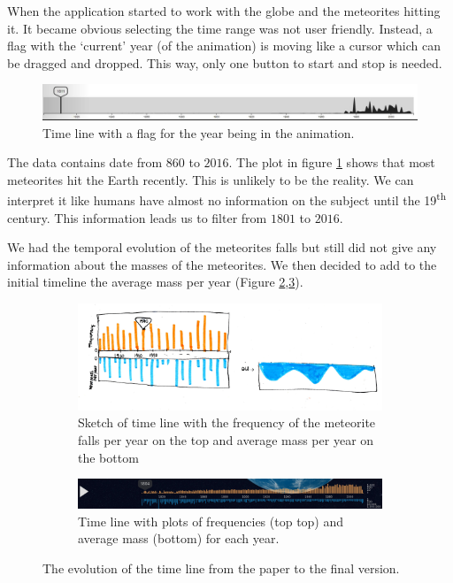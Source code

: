 \documentclass[10pt,conference,compsocconf]{IEEEtran}
\begin{document}
When the application started to work with the globe and the meteorites hitting it. It became obvious selecting the time range was not user friendly. Instead, a flag with the `current' year (of the animation) is moving like a cursor which can be dragged and dropped. This way, only one button to start and stop is needed.

\begin{figure}[H]
  \centering
  \includegraphics[width=\columnwidth]{images/timeline_original.jpg}
  \vspace{-3mm}
  \caption{Time line with a flag for the year being in the animation.}
  \label{fig:timeline_all_dates}
\end{figure}

The data contains date from $860$ to $2016$. The plot in figure \ref{fig:timeline_all_dates} shows that most meteorites hit the Earth recently. This is unlikely to be the reality. We can interpret it like humans have almost no information on the subject until the 19\textsuperscript{th} century. This information leads us to filter from $1801$ to $2016$.

We had the temporal evolution of the meteorites falls but still did not give any information about the masses of the meteorites. We then decided to add to the initial timeline the average mass per year (Figure \ref{fig:timeline_sketch},\ref{fig:timeline_final_without_label}).


\begin{figure}
\centering
\begin{subfigure}{.45\textwidth}
  \centering
  \includegraphics[width=.8\linewidth]{images/timeline_sketch}
  \caption{Sketch of time line with the frequency of the meteorite falls per year on the top and average mass per year on the bottom}
  \label{fig:timeline_sketch}
\end{subfigure}%
\begin{subfigure}{.45\textwidth}
  \centering
  \includegraphics[width=.8\linewidth]{images/timeline_final_without_label.png}
  \caption{Time line with plots of frequencies (top top) and average mass (bottom) for each year.}
  \label{fig:timeline_final_without_label}
\end{subfigure}
\caption{The evolution of the time line from the paper to the final version.}
\label{fig:test}
\end{figure}
\end{document}

